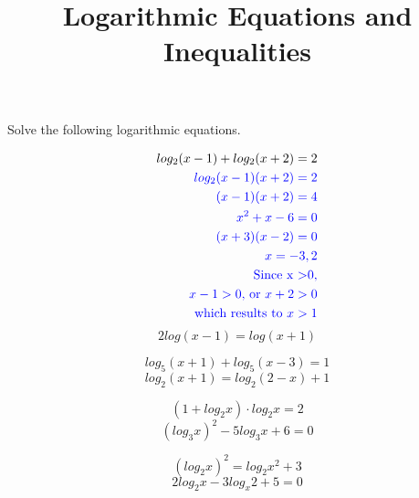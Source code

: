 \documentclass[leqno, 11pt]{article}
\begin{document}
\title{Logarithmic Equations and Inequalities}

Solve the following logarithmic equations.\\

\begin{multicols}{2}
	\begin{align*}
    log_2(x - 1) + log_2(x + 2) = 2\\
	  \color{blue}
	  	log_2(x - 1)(x + 2) = 2\\
	  \color{blue}
		(x - 1)(x + 2) = 4\\
	  \color{blue}
		x^2 + x - 6 = 0\\
	  \color{blue}
		(x + 3)(x - 2) = 0\\
	  \color{blue}
		x = -3, 2\\ 
	  \color{blue}
		\text{Since x \textgreater 0},\\
	  \color{blue}
		x - 1 > 0\text{, or } x + 2 > 0\\
	  \color{blue}
		\text{which results to } x > 1
	\end{align*}
  \begin{equation}
    2log(x - 1) = log(x + 1)
  \end{equation}
\end{multicols}


\begin{multicols}{2}
  \begin{equation}
	log_5(x + 1) + log_5(x - 3) = 1
  \end{equation}\break
  \begin{equation}
	log_2(x + 1) = log_2(2 - x) + 1
  \end{equation}
\end{multicols}


\clearpage

\begin{multicols}{2}
  \begin{equation}
	  (1 + log_2x) \cdot log_2x = 2
  \end{equation}\break
  \begin{equation}
	  (log_3x)^2 - 5log_3x + 6 = 0
  \end{equation}
\end{multicols}


\begin{multicols}{2}
  \begin{equation}
	  (log_2x)^2 = log_2x^2 + 3
  \end{equation}\break
  \begin{equation}
	  2log_2x - 3log_x2 + 5 = 0
  \end{equation}
\end{multicols}


\clearpage
\end{document}
